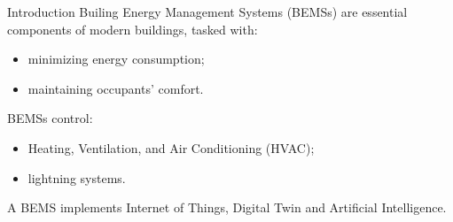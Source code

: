 \begin{tframe}{Introduction}
Builing Energy Management Systems (BEMSs) are essential components of modern buildings, tasked with:
    \begin{itemize}
        \item minimizing energy consumption;
        \item maintaining occupants' comfort.
    \end{itemize}
\vspace{0.2cm}
BEMSs control:
\begin{itemize}
    \item Heating, Ventilation, and Air Conditioning (HVAC); %
    \item lightning systems.
\end{itemize}
\vspace{0.2cm}
A BEMS implements Internet of Things, Digital Twin and Artificial Intelligence.
\end{tframe}
